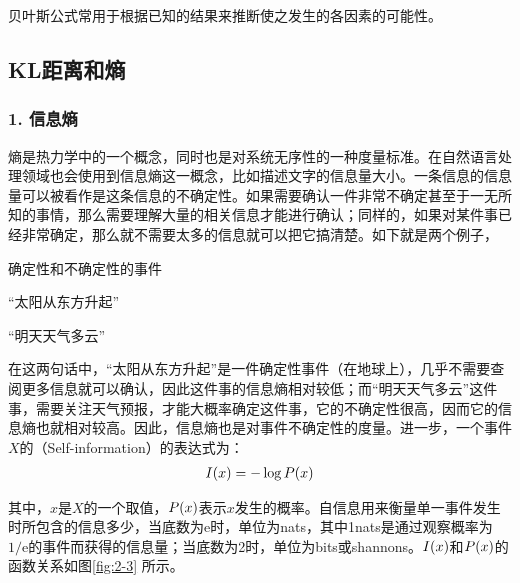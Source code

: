 \parinterval 贝叶斯公式常用于根据已知的结果来推断使之发生的各因素的可能性。


\subsection{KL距离和熵}


\subsubsection{1. 信息熵}

\parinterval 熵是热力学中的一个概念，同时也是对系统无序性的一种度量标准。在自然语言处理领域也会使用到信息熵这一概念，比如描述文字的信息量大小。一条信息的信息量可以被看作是这条信息的不确定性。如果需要确认一件非常不确定甚至于一无所知的事情，那么需要理解大量的相关信息才能进行确认；同样的，如果对某件事已经非常确定，那么就不需要太多的信息就可以把它搞清楚。如下就是两个例子，

\begin{example}
确定性和不确定性的事件

\qquad\qquad\quad“太阳从东方升起”

\qquad\qquad\quad“明天天气多云”
\label{eg:2-1}
\end{example}

\parinterval 在这两句话中，“太阳从东方升起”是一件确定性事件（在地球上），几乎不需要查阅更多信息就可以确认，因此这件事的信息熵相对较低；而“明天天气多云”这件事，需要关注天气预报，才能大概率确定这件事，它的不确定性很高，因而它的信息熵也就相对较高。因此，信息熵也是对事件不确定性的度量。进一步，一个事件$X$的{\small{}}（Self-information）的表达式为：
\begin{eqnarray}
{I}(x)=-\log {P}(x)
\label{eq:2-13}
\end{eqnarray}

\noindent 其中，$x$是$X$的一个取值，${P}(x)$表示$x$发生的概率。自信息用来衡量单一事件发生时所包含的信息多少，当底数为e时，单位为nats，其中1nats是通过观察概率为$1/\textrm{e}$的事件而获得的信息量；当底数为2时，单位为bits或shannons。${I}(x)$和${P}(x)$的函数关系如图\ref{fig:2-3} 所示。

